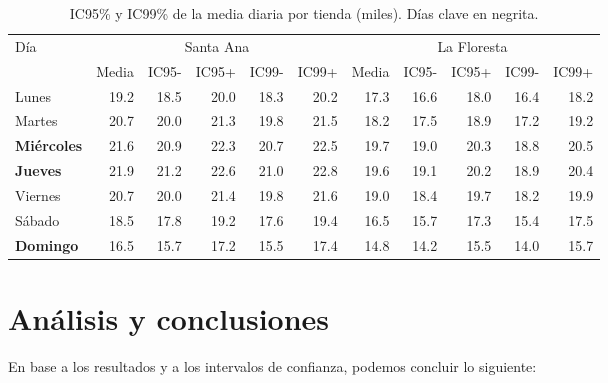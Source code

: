 \documentclass[12pt,a4paper]{article}
\begin{document}
\begin{table}[H]
  \centering
  \small
  \begin{tabular}{l rrrrr | rrrrr}
    \toprule
    Día & \multicolumn{5}{c}{Santa Ana} & \multicolumn{5}{c}{La Floresta}\\
         & Media & IC95- & IC95+ & IC99- & IC99+ & Media & IC95- & IC95+ & IC99- & IC99+\\
    \midrule
    Lunes     & 19.2 & 18.5 & 20.0 & 18.3 & 20.2 & 17.3 & 16.6 & 18.0 & 16.4 & 18.2\\
    Martes    & 20.7 & 20.0 & 21.3 & 19.8 & 21.5 & 18.2 & 17.5 & 18.9 & 17.2 & 19.2\\
    \textbf{Miércoles} & 21.6 & 20.9 & 22.3 & 20.7 & 22.5 & 19.7 & 19.0 & 20.3 & 18.8 & 20.5\\
    \textbf{Jueves}    & 21.9 & 21.2 & 22.6 & 21.0 & 22.8 & 19.6 & 19.1 & 20.2 & 18.9 & 20.4\\
    Viernes   & 20.7 & 20.0 & 21.4 & 19.8 & 21.6 & 19.0 & 18.4 & 19.7 & 18.2 & 19.9\\
    Sábado    & 18.5 & 17.8 & 19.2 & 17.6 & 19.4 & 16.5 & 15.7 & 17.3 & 15.4 & 17.5\\
    \textbf{Domingo}   & 16.5 & 15.7 & 17.2 & 15.5 & 17.4 & 14.8 & 14.2 & 15.5 & 14.0 & 15.7\\
    \bottomrule
  \end{tabular}
  \caption{IC95\% y IC99\% de la media diaria por tienda (miles). Días clave en negrita.}
\end{table}

\section{Análisis y conclusiones}
En base a los resultados y a los intervalos de confianza, podemos concluir lo siguiente:
\end{document}

